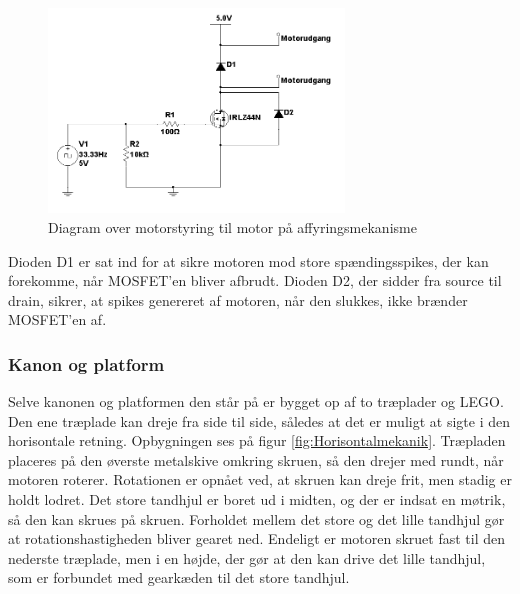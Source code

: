 \begin{figure}[H]
	\centering
	\includegraphics[width=0.7\textwidth]{Afsnit/DesignOgImplementering/images/motor_affyring}
	\caption{Diagram over motorstyring til motor på affyringsmekanisme}
	\label{fig:affyringsmotor}
\end{figure}

Dioden D1 er sat ind for at sikre motoren mod store spændingsspikes, der kan forekomme, når MOSFET'en bliver afbrudt. Dioden D2, der sidder fra source til drain, sikrer, at spikes genereret af motoren, når den slukkes, ikke brænder MOSFET'en af. 

\subsubsection{Kanon og platform}
Selve kanonen og platformen den står på er bygget op af to træplader og LEGO. Den ene træplade kan dreje fra side til side, således at det er muligt at sigte i den horisontale retning. Opbygningen ses på figur \ref{fig:Horisontalmekanik}. Træpladen placeres på den øverste metalskive omkring skruen, så den drejer med rundt, når motoren roterer. Rotationen er opnået ved, at skruen kan dreje frit, men stadig er holdt lodret. Det store tandhjul er boret ud i midten, og der er indsat en møtrik, så den kan skrues på skruen. Forholdet mellem det store og det lille tandhjul gør at rotationshastigheden bliver gearet ned. Endeligt er motoren skruet fast til den nederste træplade, men i en højde, der gør at den kan drive det lille tandhjul, som er forbundet med gearkæden til det store tandhjul. 

